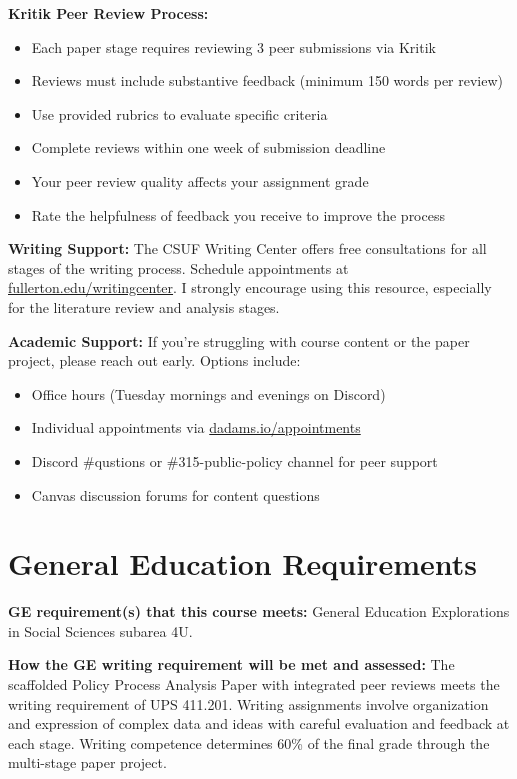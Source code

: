 \documentclass[12pt]{article}     %
\begin{document}
\vspace{0.5em}
\noindent \textbf{Kritik Peer Review Process:} 
\begin{itemize}
\item Each paper stage requires reviewing 3 peer submissions via Kritik
\item Reviews must include substantive feedback (minimum 150 words per review)
\item Use provided rubrics to evaluate specific criteria
\item Complete reviews within one week of submission deadline
\item Your peer review quality affects your assignment grade
\item Rate the helpfulness of feedback you receive to improve the process
\end{itemize}

\vspace{0.5em}
\noindent \textbf{Writing Support:} The CSUF Writing Center offers free consultations for all stages of the writing process. Schedule appointments at \href{http://www.fullerton.edu/writingcenter/}{fullerton.edu/writingcenter}. I strongly encourage using this resource, especially for the literature review and analysis stages.

\vspace{0.5em}
\noindent \textbf{Academic Support:} If you're struggling with course content or the paper project, please reach out early. Options include:
\begin{itemize}
\item Office hours (Tuesday mornings and evenings on Discord)
\item Individual appointments via \href{https://dadams.io/appointments}{dadams.io/appointments}
\item Discord \#qustions or \#315-public-policy channel for peer support
\item Canvas discussion forums for content questions
\end{itemize}

\section{General Education Requirements}
\noindent \textbf{GE requirement(s) that this course meets:} General Education Explorations in Social Sciences subarea 4U.

\vspace{0.5em}
\noindent \textbf{How the GE writing requirement will be met and assessed:}
The scaffolded Policy Process Analysis Paper with integrated peer reviews meets the writing requirement of UPS 411.201. Writing assignments involve organization and expression of complex data and ideas with careful evaluation and feedback at each stage. Writing competence determines 60\% of the final grade through the multi-stage paper project.
\end{document}

